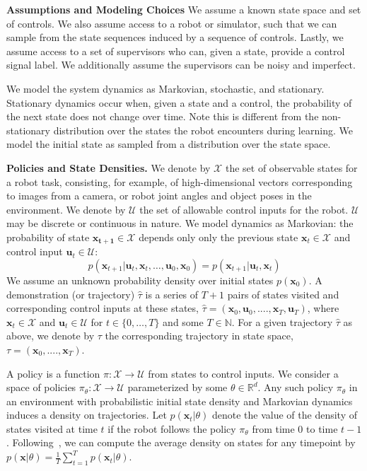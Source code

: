 \documentclass[10pt, conference]{ieeeconf}      %
\newcommand{\bu}{\mathbf{u}}
\newcommand{\bx}{\mathbf{x}}
\begin{document}
\noindent\textbf{Assumptions and Modeling Choices } 
We assume a known state space and set of controls. We also assume access to a robot or simulator, such that we can sample from the state sequences induced by a sequence of controls. Lastly, we assume access to a set of supervisors who can, given a state, provide a control signal label. We additionally assume the supervisors can be noisy and imperfect.

 We model the system dynamics as Markovian, stochastic, and stationary. Stationary dynamics occur when, given a state and a control, the probability of the next state does not change over time. Note this is different from the non-stationary distribution over the states the robot encounters during learning. We model the initial state as sampled from a distribution over the state space. 


\noindent\textbf{Policies and State Densities.}
We denote by $\mathcal{X}$ the set of observable states for a robot task, consisting, for example, of 
high-dimensional vectors corresponding to images from a camera, or robot joint angles and object poses in the environment.
We denote by $\mathcal{U}$ the set of allowable control inputs for the robot. $\mathcal{U}$ may be discrete or
continuous in nature. We model dynamics as Markovian: the probability of state $\mathbf{x_{t+1}}\in
\mathcal{X}$ depends only only the previous state $\mathbf{x}_t\in\mathcal{X}$ and control input $\mathbf{u}_t\in
\mathcal{U}$: 
$$p(\bx_{t+1}|\bu_{t},\bx_{t}, \ldots, \bu_{0}, \bx_{0})=p(\bx_{t+1}|\bu_{t}, \bx_t)$$
We assume an unknown probability density over initial states $p(\bx_0)$.
A demonstration (or trajectory) $\hat{\tau}$ is a series of $T+1$ pairs of states visited and corresponding
control inputs at these states, $\hat{\tau} = (\mathbf{x}_0,\mathbf{u}_0, ...., \mathbf{x}_T,\mathbf{u}_T)$, where $\bx_t\in \mathcal{X}$
and $\bu_t\in \mathcal{U}$ for $t\in \{0, \ldots, T\}$ and some $T\in \mathbb{N}$.  
For a given trajectory $\hat{\tau}$ as above, we denote by ${\tau}$ the corresponding trajectory in state space,
${\tau} = (\bx_0,....,\bx_T)$.

A policy is a function $\pi: \mathcal{X} \to \mathcal{U}$ from states to control inputs. 
We consider a space of policies $\pi_{\theta}:\mathcal{X}\to \mathcal{U}$ parameterized by some $\theta\in \mathbb{R}^d$. Any such policy $\pi_{\theta}$ in an environment with probabilistic initial state density and Markovian dynamics
induces a density on trajectories. Let $p(\bx_t|\theta)$ denote the value of the density of states visited at time $t$ if the robot follows the policy $\pi_{\theta}$ from time $0$ to time $t-1$.  Following~\cite{ross2010reduction}, we can compute
the average density on states for any timepoint by $p(\bx|\theta) = \frac{1}{T} \sum^T_{t=1} p(\bx_t|\theta)$.
\end{document}
